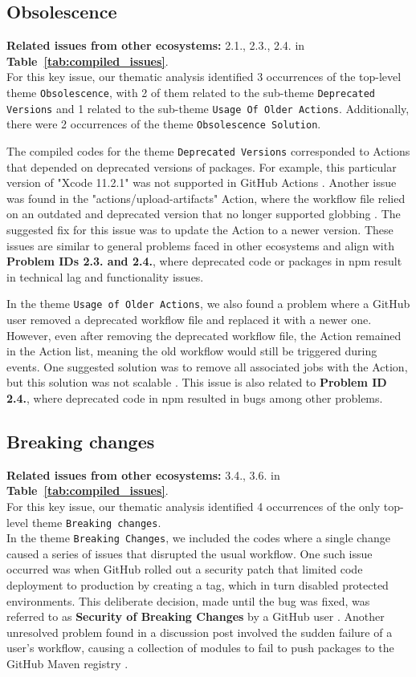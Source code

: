 \documentclass[conference]{IEEEtran}
\begin{document}
\subsection*{\textbf{Obsolescence}}
\textbf{Related issues from other ecosystems:} 2.1., 2.3., 2.4. in \textbf{Table~\ref{tab:compiled_issues}}.\\

	For this key issue, our thematic analysis identified 3 occurrences of the top-level theme \texttt{Obsolescence}, with 2 of them related to the sub-theme \texttt{Deprecated Versions} and 1 related to the sub-theme \texttt{Usage Of Older Actions}. Additionally, there were 2  occurrences of the theme \texttt{Obsolescence Solution}.

	The compiled codes for the theme \texttt{Deprecated Versions} corresponded to Actions that depended on deprecated versions of packages. For example, this particular version of "Xcode 11.2.1" was not supported in GitHub Actions \cite{sinoru2024}. Another issue was found in the "actions/upload-artifacts" Action, where the workflow file relied on an outdated and deprecated version that no longer supported globbing \cite{graysuit2024}. The suggested fix for this issue was to update the Action to a newer version. These issues are similar to general problems faced in other ecosystems and align with \textbf{Problem IDs 2.3. and 2.4.}, where deprecated code or packages in npm result in technical lag and functionality issues.


	In the theme \texttt{Usage of Older Actions}, we also found a problem where a GitHub user removed a deprecated workflow file and replaced it with a newer one. However, even after removing the deprecated workflow file, the Action remained in the Action list, meaning the old workflow would still be triggered during events. One suggested solution was to remove all associated jobs with the Action, but this solution was not scalable \cite{ryanvanderpol2024}. This issue is also related to \textbf{Problem ID 2.4.}, where deprecated code in npm resulted in bugs among other problems.
\subsection*{\textbf{Breaking changes}}
\textbf{Related issues from other ecosystems:} 3.4., 3.6. in \textbf{Table~\ref{tab:compiled_issues}}.\\

	For this key issue, our thematic analysis identified 4 occurrences of the only  top-level theme \texttt{Breaking changes}.\\
In the theme \texttt{Breaking Changes}, we included the codes where a single change caused a series of issues that disrupted the usual workflow. One such issue occurred was when GitHub rolled out a security patch that limited code deployment to production by creating a tag, which in turn disabled protected environments. This deliberate decision, made until the bug was fixed, was referred to as \textbf{Security of Breaking Changes} by a GitHub user \cite{WolfspiritM2024}. Another unresolved problem found in a discussion post involved the sudden failure of a user's workflow, causing a collection of modules to fail to push packages to the GitHub Maven registry \cite{lukas-krecan2024}.
\end{document}

